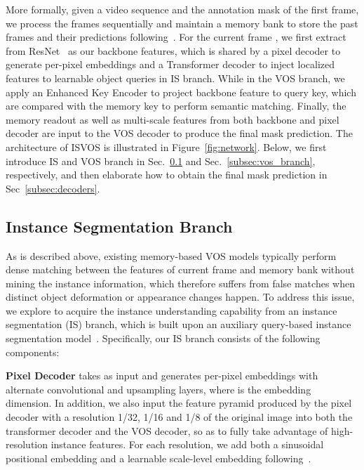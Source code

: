 \documentclass[10pt,twocolumn,letterpaper]{article}
\newcommand{\system}{ISVOS\xspace}
\begin{document}
More formally, given a video sequence  and the annotation mask of the first frame, we process the frames sequentially and maintain a memory bank to store the past frames and their predictions following~\cite{oh2019video,cheng2021stcn}. For the current frame , we first extract  from ResNet~\cite{he2016deep} as our backbone features, which is shared by a pixel decoder to generate per-pixel embeddings and a Transformer decoder to inject localized features to learnable object queries in IS branch. While in the VOS branch, we apply an Enhanced Key Encoder to project backbone feature  to query key, which are compared with the memory key to perform semantic matching. Finally, the memory readout as well as multi-scale features from both backbone and pixel decoder are input to the VOS decoder to produce the final mask prediction. The architecture of \system is illustrated in Figure~\ref{fig:network}. Below, we first introduce IS and VOS branch in Sec.~\ref{subsec:is_branch} and Sec.~\ref{subsec:vos_branch}, respectively, and then elaborate how to obtain the final mask prediction in Sec~\ref{subsec:decoders}.


\subsection{Instance Segmentation Branch}
\label{subsec:is_branch}
As is described above, existing memory-based VOS models typically perform dense matching between the features of current frame and memory bank without mining the instance information, which therefore suffers from false matches when distinct object deformation or appearance changes happen. To address this issue, we explore to acquire the instance understanding capability from an instance segmentation (IS) branch, which is built upon an auxiliary query-based instance segmentation model~\cite{cheng2022masked}. Specifically, our IS branch consists of the following components: 

\vspace{0.02in}
\noindent \textbf{Pixel Decoder} takes  as input and generates per-pixel embeddings  with alternate convolutional and upsampling layers, where  is the embedding dimension. In addition, we also input the feature pyramid  produced by the pixel decoder with a resolution 1/32, 1/16 and 1/8 of the original image into both the transformer decoder and the VOS decoder, so as to fully take advantage of high-resolution instance features. For each resolution, we add both a sinusoidal positional embedding and a learnable scale-level embedding following~\cite{zhu2021deformable,cheng2022masked}.
\end{document}

